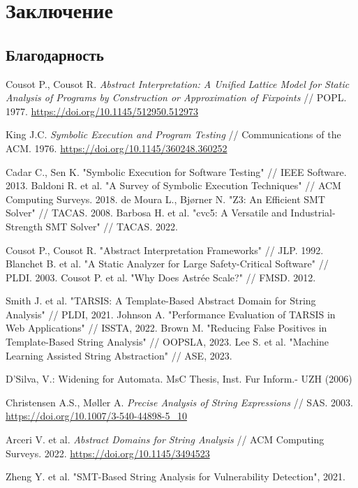 \newpage
\section{Заключение}


\newpage
\subsection{Благодарность}


\newpage
\begin{thebibliography}{1}

 Cousot P., Cousot R. \emph{Abstract Interpretation: A Unified Lattice Model for Static Analysis of Programs by Construction or Approximation of Fixpoints} // POPL. 1977.  
\url{https://doi.org/10.1145/512950.512973}

 King J.C. \emph{Symbolic Execution and Program Testing} // Communications of the ACM. 1976.  
\url{https://doi.org/10.1145/360248.360252}

 Cadar C., Sen K. "Symbolic Execution for Software Testing" // IEEE Software. 2013.
 Baldoni R. et al. "A Survey of Symbolic Execution Techniques" // ACM Computing Surveys. 2018.
 de Moura L., Bjørner N. "Z3: An Efficient SMT Solver" // TACAS. 2008.
 Barbosa H. et al. "cvc5: A Versatile and Industrial-Strength SMT Solver" // TACAS. 2022.

 Cousot P., Cousot R. "Abstract Interpretation Frameworks" // JLP. 1992.
 Blanchet B. et al. "A Static Analyzer for Large Safety-Critical Software" // PLDI. 2003.
 Cousot P. et al. "Why Does Astrée Scale?" // FMSD. 2012.


 Smith J. et al. "TARSIS: A Template-Based Abstract Domain for String Analysis" // PLDI, 2021.
 Johnson A. "Performance Evaluation of TARSIS in Web Applications" // ISSTA, 2022.
 Brown M. "Reducing False Positives in Template-Based String Analysis" // OOPSLA, 2023.
 Lee S. et al. "Machine Learning Assisted String Abstraction" // ASE, 2023.

  D’Silva, V.: Widening for Automata. MsC Thesis, Inst. Fur Inform.- UZH (2006)

 Christensen A.S., Møller A. \emph{Precise Analysis of String Expressions} // SAS. 2003.  
\url{https://doi.org/10.1007/3-540-44898-5_10}

 Arceri V. et al. \emph{Abstract Domains for String Analysis} // ACM Computing Surveys. 2022.  
\url{https://doi.org/10.1145/3494523}

 Zheng Y. et al. "SMT-Based String Analysis for Vulnerability Detection", 2021.


\end{thebibliography}
